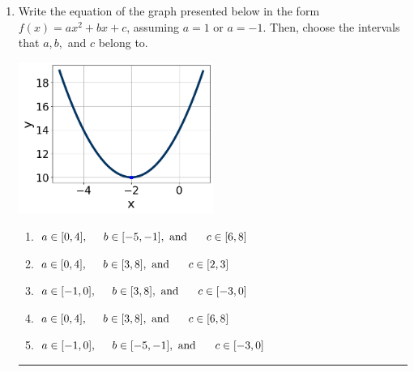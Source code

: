 \documentclass[14pt]{extbook}
\newcommand{\litem}[1]{\item#1\hspace*{-1cm}\rule{\textwidth}{0.4pt}}
\begin{document}
\begin{enumerate}
{\begin{enumerate}[label=\Alph*.]
\end{enumerate} }
\litem{
Write the equation of the graph presented below in the form $f(x)=ax^2+bx+c$, assuming  $a=1$ or $a=-1$. Then, choose the intervals that $a, b,$ and $c$ belong to.
\begin{center}
    \includegraphics[width=0.5\textwidth]{../Figures/quadraticGraphToEquationCopyC.png}
\end{center}
\begin{enumerate}[label=\Alph*.]
\item \( a \in [0, 4], \hspace*{5mm} b \in [-5, -1], \text{ and } \hspace*{5mm} c \in [6, 8] \)
\item \( a \in [0, 4], \hspace*{5mm} b \in [3, 8], \text{ and } \hspace*{5mm} c \in [2, 3] \)
\item \( a \in [-1, 0], \hspace*{5mm} b \in [3, 8], \text{ and } \hspace*{5mm} c \in [-3, 0] \)
\item \( a \in [0, 4], \hspace*{5mm} b \in [3, 8], \text{ and } \hspace*{5mm} c \in [6, 8] \)
\item \( a \in [-1, 0], \hspace*{5mm} b \in [-5, -1], \text{ and } \hspace*{5mm} c \in [-3, 0] \)


\end{enumerate}}
\end{enumerate}
\end{document}

